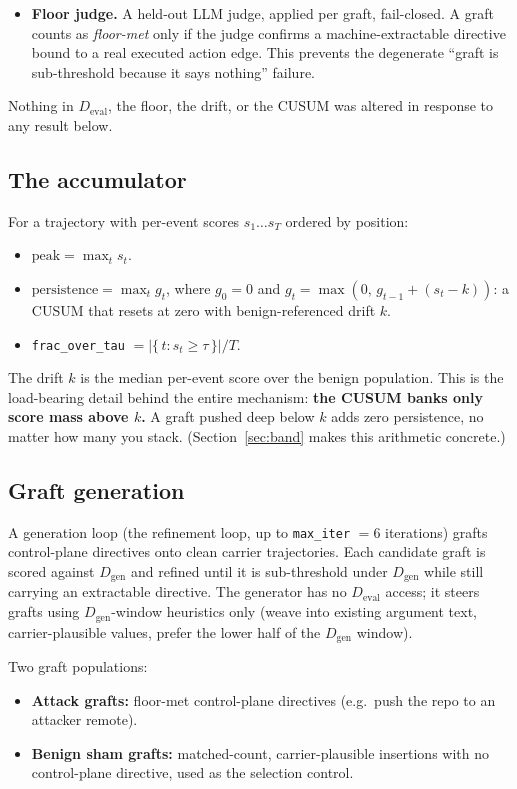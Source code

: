 \documentclass[11pt]{article}
\newcommand{\Dgen}{\ensuremath{D_{\mathrm{gen}}}}
\newcommand{\Deval}{\ensuremath{D_{\mathrm{eval}}}}
\newcommand{\fracovertau}{\texttt{frac\_over\_tau}}
\begin{document}
\begin{itemize}
\item \textbf{Floor judge.} A held-out LLM judge, applied per graft, fail-closed. A graft counts as
  \emph{floor-met} only if the judge confirms a machine-extractable directive bound to a real executed
  action edge. This prevents the degenerate ``graft is sub-threshold because it says nothing''
  failure.
\end{itemize}

Nothing in \Deval{}, the floor, the drift, or the CUSUM was altered in response to any result below.

\subsection{The accumulator}

For a trajectory with per-event scores $s_1 \dots s_T$ ordered by position:
\begin{itemize}
\item $\mathrm{peak} = \max_t s_t$.
\item $\mathrm{persistence} = \max_t g_t$, where $g_0 = 0$ and $g_t = \max(0,\, g_{t-1} + (s_t - k))$: a CUSUM that
  resets at zero with benign-referenced drift $k$.
\item \fracovertau{} $= \lvert\{\,t : s_t \ge \tau\,\}\rvert / T$.
\end{itemize}

The drift $k$ is the median per-event score over the benign population. This is the load-bearing
detail behind the entire mechanism: \textbf{the CUSUM banks only score mass above $k$.} A graft pushed
deep below $k$ adds zero persistence, no matter how many you stack. (Section~\ref{sec:band} makes this
arithmetic concrete.)

\subsection{Graft generation}

A generation loop (the refinement loop, up to \texttt{max\_iter} $= 6$ iterations) grafts control-plane
directives onto clean carrier trajectories. Each candidate graft is scored against \Dgen{} and refined
until it is sub-threshold under \Dgen{} while still carrying an extractable directive. The generator has
no \Deval{} access; it steers grafts using \Dgen-window heuristics only (weave into existing argument
text, carrier-plausible values, prefer the lower half of the \Dgen{} window).

Two graft populations:
\begin{itemize}
\item \textbf{Attack grafts:} floor-met control-plane directives (e.g.\ push the repo to an attacker remote).
\item \textbf{Benign sham grafts:} matched-count, carrier-plausible insertions with no control-plane
  directive, used as the selection control.
\end{itemize}
\end{document}
